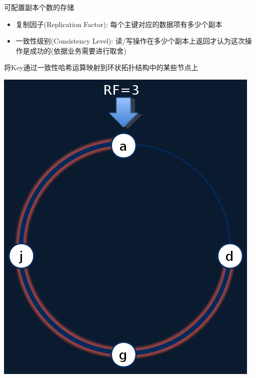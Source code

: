 \documentclass{beamer}
\begin{document}
\begin{CJK}{UTF8}{gbsn}
\begin{frame}{可配置副本个数的存储}
  \begin{itemize}
  \item {
      复制因子(Replication Factor): 每个主键对应的数据项有多少个副本
  }
  \item {
      一致性级别(Consistency Level): 读/写操作在多少个副本上返回才认为这次操作是成功的(依据业务需要进行取舍)
  }
  \end{itemize}
  \pause
  \begin{block}{将Key通过一致性哈希运算映射到环状拓扑结构中的某些节点上}
  \begin{center}
    \includegraphics[scale=0.22]{./images/ring-topology-rf3}
  \end{center}
  \end{block}
\end{frame}


\end{CJK}
\end{document}
